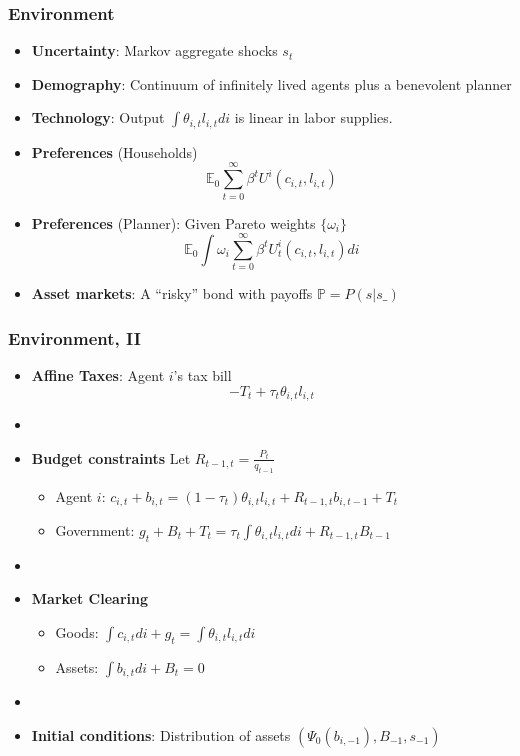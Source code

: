 \documentclass{beamer}
\begin{document}
\begin{frame}
 \frametitle{Environment}
 \begin{itemize}
 \item \textbf{Uncertainty}: Markov aggregate shocks $s_t$
  \item \textbf{Demography}: Continuum of infinitely lived agents plus a benevolent planner
  \item \textbf{Technology}: Output $\int \theta_{i,t} l_{i,t}di$ is linear in labor supplies.
  \item \textbf{Preferences }(Households)
  \begin{equation*}
\mathbb{E}_{0}\sum_{t=0}^{\infty } \beta^t U^{i}\left(
c_{i,t},l_{i,t}\right)  \label{utility lifetime}
\end{equation*}%
\item \textbf{Preferences} (Planner): Given Pareto weights $\{\omega_i\}$
\begin{equation*}
\mathbb{E}_{0}\int \omega_i\sum_{t=0}^{\infty }\beta^t U_{t}^{i}\left( c_{i,t},l_{i,t}\right)di  \label{govmt objective}
\end{equation*}
  \item \textbf{Asset markets}: A ``risky'' bond with payoffs $\mathbb{P}=P(s|s\_)$
  \end{itemize}

\end{frame}



\begin{frame}
 \frametitle{Environment, II}
 \begin{itemize}
  \item \textbf{Affine Taxes}: Agent $i$'s tax bill
\[- T_t + \tau_t \theta_{i,t}l_{i,t}\]

\item[]
  \item \textbf{Budget constraints} Let $R_{t-1,t}=\frac{P_t}{q_{t-1}}$
  \begin{itemize}
   \item Agent $i$: $ c_{i,t}+b_{i,t}=\left( 1-\tau _{t}\right) \theta _{i,t}l_{i,t}+R_{t-1,t}b_{i,t-1}+T_{t}$
\item Government: $g_{t}+B_{t}+T_t=\tau _{t}\int \theta_{i,t}l_{i,t}di+R_{t-1,t}B_{t-1}$
  \end{itemize}

\item[]
  \item \textbf{Market Clearing}
  \begin{itemize}
   \item Goods: $\int c_{i,t}di+g_t =\int \theta _{i,t} l_{i,t}di$

   \item Assets: $\int b_{i,t}di +B_{t}=0$

  \end{itemize}
  \item[]

\item \textbf{Initial conditions}: Distribution of assets $(\Psi_0(b_{i,-1}),B_{-1},s_{-1})$
\end{itemize}
\end{frame}
\end{document}
